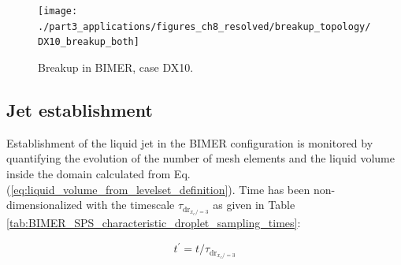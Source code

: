 \begin{figure}[ht]
\centering
\texttt{[image: ./part3\_applications/figures\_ch8\_resolved/breakup\_topology/DX10\_breakup\_both]}
\caption{Breakup in BIMER, case DX10. }
\label{fig:BIMER_breakup_topology}
\end{figure}

\subsection{Jet establishment}

Establishment of the liquid jet in the BIMER configuration is monitored by quantifying the evolution of the number of mesh elements and the liquid volume inside the domain calculated from Eq. (\ref{eq:liquid_volume_from_levelset_definition}). Time has been non-dimensionalized with the timescale $\tau_{\mathrm{dr}_{x_c/=3}}$ as given in Table \ref{tab:BIMER_SPS_characteristic_droplet_sampling_times}:



\begin{equation}
\label{eq:t_prime_BIMER_with_tau_drx10}
t^{\prime} = t / \tau_{\mathrm{dr}_{x_c/=3}}
\end{equation}


